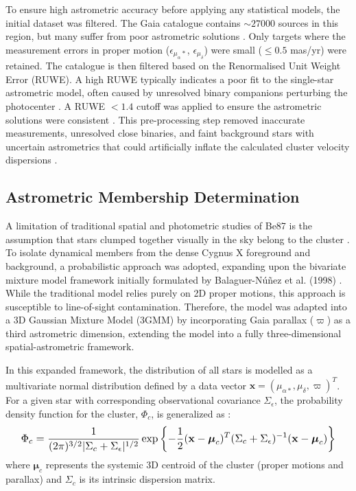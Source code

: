 \documentclass{CU_IOPStyle_PXT999}
\begin{document}
To ensure high astrometric accuracy before applying any statistical models, the initial dataset was filtered. The Gaia catalogue contains $\sim 27000$ sources in this region, but many suffer from poor astrometric solutions \cite{gaia_collaboration_gaia_2023, lindegren_2021}. Only targets where the measurement errors in proper motion ($\epsilon_{\mu_\alpha *}$, $\epsilon_{\mu_\delta}$) were small ($\le 0.5$ mas/yr) were retained. The catalogue is then filtered based on the Renormalised Unit Weight Error (RUWE). A high RUWE typically indicates a poor fit to the single-star astrometric model, often caused by unresolved binary companions perturbing the photocenter \cite{belokurov_2008}. A RUWE $< 1.4$ cutoff was applied to ensure the astrometric solutions were consistent \cite{lindegren_2018}. This pre-processing step removed inaccurate measurements, unresolved close binaries, and faint background stars with uncertain astrometrics that could artificially inflate the calculated cluster velocity dispersions \cite{gieles_2010}.

\subsection{Astrometric Membership Determination}
\label{ssec:2.2}
A limitation of traditional spatial and photometric studies of Be87 is the assumption that stars clumped together visually in the sky belong to the cluster \cite{de_la_fuente_clustered_2021}. To isolate dynamical members from the dense Cygnus X foreground and background, a probabilistic approach was adopted, expanding upon the bivariate mixture model framework initially formulated by Balaguer-N\'u\~nez et al. (1998) \cite{balaguer-nunez_determination_1998}. While the traditional model relies purely on 2D proper motions, this approach is susceptible to line-of-sight contamination. Therefore, the model was adapted into a 3D Gaussian Mixture Model (3GMM) by incorporating Gaia parallax ($\varpi$) as a third astrometric dimension, extending the model into a fully three-dimensional spatial-astrometric framework.

In this expanded framework, the distribution of all stars is modelled as a multivariate normal distribution defined by a data vector $\mathbf{x} = (\mu_{\alpha*}, \mu_{\delta}, \varpi)^T$. For a given star with corresponding observational covariance $\Sigma_{\epsilon}$, the probability density function for the cluster, $\Phi_c$, is generalized as \cite{zhao_1990}:
\begin{equation}
    \resizebox{0.95\columnwidth}{!}{$\displaystyle
        \Phi_c = \frac{1}{(2\pi)^{3/2} |\Sigma_c + \Sigma_{\epsilon}|^{1/2}} \exp \left\{ -\frac{1}{2} (\mathbf{x} - \boldsymbol{\mu}_c)^T (\Sigma_c + \Sigma_{\epsilon})^{-1} (\mathbf{x} - \boldsymbol{\mu}_c) \right\}
    $}
\end{equation}
where $\boldsymbol{\mu}_c$ represents the systemic 3D centroid of the cluster (proper motions and parallax) and $\Sigma_c$ is its intrinsic dispersion matrix.
\end{document}
